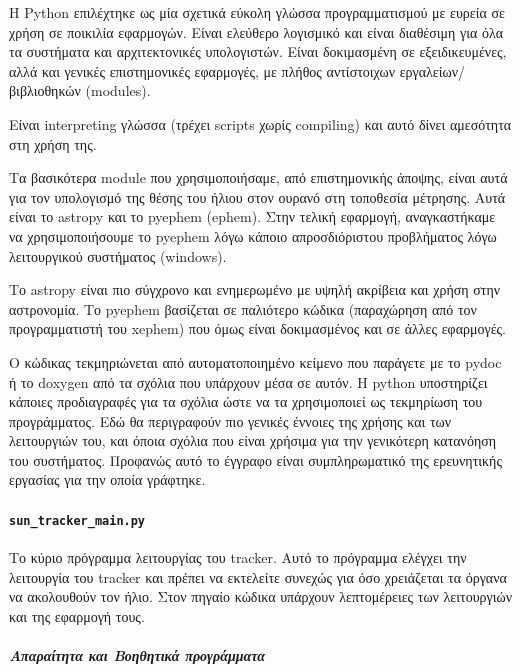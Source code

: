 \documentclass[
  a4paper,
  twoside,
  titlepage,
  11pt]{article}
\numberwithin{equation}{section}
\numberwithin{figure}{section}
\numberwithin{table}{section}
\begin{document}
Η Python επιλέχτηκε ως μία σχετικά εύκολη γλώσσα προγραμματισμού με ευρεία σε χρήση σε ποικιλία εφαρμογών. Είναι ελεύθερο λογισμικό και είναι διαθέσιμη για όλα τα συστήματα και αρχιτεκτονικές υπολογιστών. Είναι δοκιμασμένη σε εξειδικευμένες, αλλά και γενικές επιστημονικές εφαρμογές, με πλήθος αντίστοιχων εργαλείων/βιβλιοθηκών (modules).

Είναι interpreting γλώσσα (τρέχει scripts χωρίς compiling) και αυτό δίνει αμεσότητα στη χρήση της.

Τα βασικότερα module που χρησιμοποιήσαμε, από επιστημονικής άποψης, είναι αυτά για τον υπολογισμό της θέσης του ήλιου στον ουρανό στη τοποθεσία μέτρησης. Αυτά είναι το astropy και το pyephem (ephem). Στην τελική εφαρμογή, αναγκαστήκαμε να χρησιμοποιήσουμε το pyephem λόγω κάποιο απροσδιόριστου προβλήματος λόγω λειτουργικού συστήματος (windows).

Το astropy είναι πιο σύγχρονο και ενημερωμένο με υψηλή ακρίβεια και χρήση στην αστρονομία. Το pyephem βασίζεται σε παλιότερο κώδικα (παραχώρηση από τον προγραμματιστή του xephem) που όμως είναι δοκιμασμένος και σε άλλες εφαρμογές.

Ο κώδικας τεκμηριώνεται από αυτοματοποιημένο κείμενο που παράγετε με το pydoc ή το doxygen από τα σχόλια που υπάρχουν μέσα σε αυτόν. Η python υποστηρίζει κάποιες προδιαγραφές για τα σχόλια ώστε να τα χρησιμοποιεί ως τεκμηρίωση του προγράμματος. Εδώ θα περιγραφούν πιο γενικές έννοιες της χρήσης και των λειτουργιών του, και όποια σχόλια που είναι χρήσιμα για την γενικότερη κατανόηση του συστήματος. Προφανώς αυτό το έγγραφο είναι συμπληρωματικό της ερευνητικής εργασίας για την οποία γράφτηκε.

\hypertarget{sun_tracker_main.py}{%
\paragraph{\texorpdfstring{\texttt{sun\_tracker\_main.py}}{sun\_tracker\_main.py}}\label{sun_tracker_main.py}}

Το κύριο πρόγραμμα λειτουργίας του tracker. Αυτό το πρόγραμμα ελέγχει την λειτουργία του tracker και πρέπει να εκτελείτε συνεχώς για όσο χρειάζεται τα όργανα να ακολουθούν τον ήλιο. Στον πηγαίο κώδικα υπάρχουν λεπτομέρειες των λειτουργιών και της εφαρμογή τους.

\hypertarget{ux3b1ux3c0ux3b1ux3c1ux3b1ux3afux3c4ux3b7ux3c4ux3b1-ux3baux3b1ux3b9-ux3b2ux3bfux3b7ux3b8ux3b7ux3c4ux3b9ux3baux3ac-ux3c0ux3c1ux3bfux3b3ux3c1ux3acux3bcux3bcux3b1ux3c4ux3b1}{%
\subparagraph{Απαραίτητα και Βοηθητικά προγράμματα}\label{ux3b1ux3c0ux3b1ux3c1ux3b1ux3afux3c4ux3b7ux3c4ux3b1-ux3baux3b1ux3b9-ux3b2ux3bfux3b7ux3b8ux3b7ux3c4ux3b9ux3baux3ac-ux3c0ux3c1ux3bfux3b3ux3c1ux3acux3bcux3bcux3b1ux3c4ux3b1}}
\end{document}
